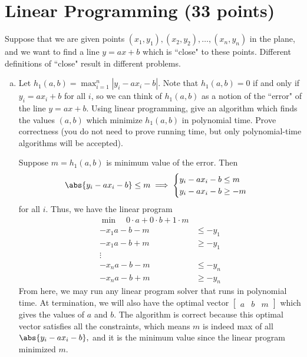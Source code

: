 \documentclass{article}
\begin{document}
\newpage
\section{Linear Programming (33 points)}

Suppose that we are given points $(x_1, y_1), (x_2, y_2), \dots, (x_n, y_n)$ in the plane, and we want to find a line $y = ax + b$ which is ``close" to these points.  Different definitions of ``close" result in different problems.

\begin{enumerate}[(a)]
	\item Let $h_1(a,b) = \max_{i=1}^n |y_i - a x_i - b|$.  Note that $h_1(a,b) = 0$ if and only if $y_i = ax_i + b$ for all $i$, so we can think of $h_1(a,b)$ as a notion of the ``error" of the line $y = ax + b$.  Using linear programming, give an algorithm which finds the values $(a,b)$ which minimize $h_1(a,b)$ in polynomial time.  Prove correctness (you do not need to prove running time, but only polynomial-time algorithms will be accepted).  
		\begin{soln}
			Suppose $m=h_1(a, b)$ is minimum value of the error. Then 
			\begin{align*}
				\abs{y_i-ax_i-b}\le m\implies \begin{cases}
					y_i-ax_i-b\le m \\
					y_i-ax_i-b\ge -m
				\end{cases}
			\end{align*}
			for all $i.$ Thus, we have the linear program 
			\begin{align*}
				\min \quad0\cdot a + 0\cdot b + 1\cdot m \\
				-x_1a - b - m &\le -y_1 \\
				-x_1a - b + m &\ge -y_1 \\
				\vdots \\
				-x_n a - b - m &\le -y_n \\
				-x_n a - b + m &\ge -y_n 
			\end{align*}
			From here, we may run any linear program solver that runs in polynomial time. At termination, we will also have the optimal vector $\begin{bmatrix}
				a & b & m
			\end{bmatrix}$
			which gives the values of $a$ and $b.$ The algorithm is correct because this optimal vector satisfies all the constraints, which means $m$ is indeed max of all $\abs{y_i-ax_i-b},$ and it is the minimum value since the linear program minimized $m.$
		\end{soln}


\end{enumerate}
\end{document}
